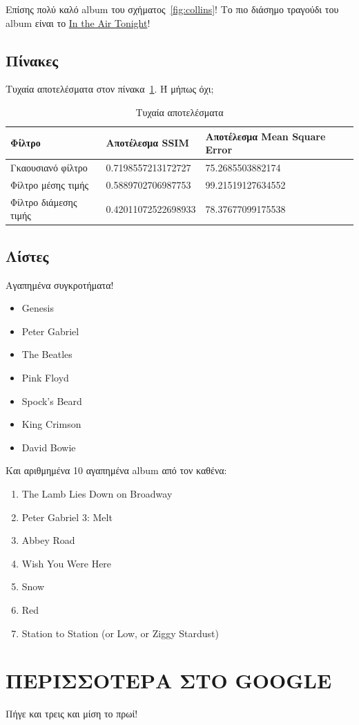 Επίσης πολύ καλό album του σχήματος~\ref{fig:collins}! Το πιο διάσημο τραγούδι του album είναι το \href{https://www.youtube.com/watch?v=IeDMnyQzS88}{In the Air Tonight}!

\subsection{Πίνακες}

Τυχαία αποτελέσματα στον πίνακα~\ref{tab:results_poisson_noise}. Ή μήπως όχι;

\begin{table}[H]
  \centering
  \begin{tabular}{| p{2cm} | p{7cm} | p{6.5cm} |}
  \hline
  \textbf{Φίλτρο} & \textbf{Αποτέλεσμα SSIM} & \textbf{Αποτέλεσμα Mean Square Error} \\
  \hline
  Γκαουσιανό φίλτρο & 0.7198557213172727 & 75.2685503882174 \\
  \hline
  Φίλτρο μέσης τιμής & 0.5889702706987753 & 99.21519127634552 \\
  \hline
  Φίλτρο διάμεσης τιμής & 0.42011072522698933 & 78.37677099175538 \\
  \hline
  \end{tabular}
  \caption{Τυχαία αποτελέσματα}
  \label{tab:results_poisson_noise}
\end{table}

\subsection{Λίστες}

Αγαπημένα συγκροτήματα!

\begin{itemize}
	\item Genesis
	\item Peter Gabriel
	\item The Beatles
	\item Pink Floyd
	\item Spock's Beard
	\item King Crimson
	\item David Bowie
\end{itemize}

Και αριθμημένα 10 αγαπημένα album από τον καθένα:

\begin{enumerate}
	\item The Lamb Lies Down on Broadway
	\item Peter Gabriel 3: Melt
	\item Abbey Road
	\item Wish You Were Here
	\item Snow
	\item Red
	\item Station to Station (or Low, or Ziggy Stardust)
\end{enumerate}

\section{ΠΕΡΙΣΣΟΤΕΡΑ ΣΤΟ GOOGLE}

Πήγε και τρεις και μίση το πρωί!
